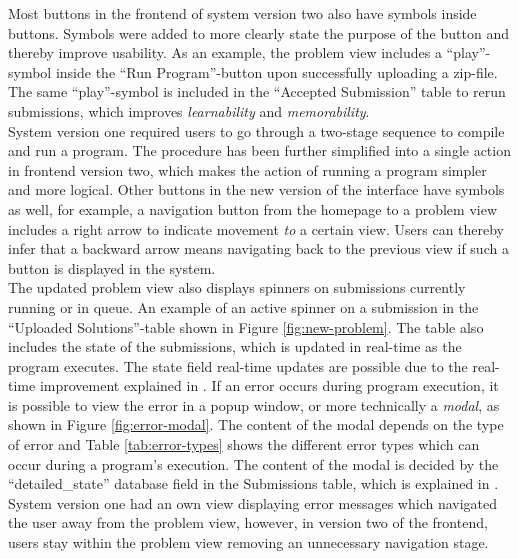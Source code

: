 Most buttons in the frontend of system version two also have symbols inside buttons. Symbols were added to more clearly state the purpose of the button and thereby improve usability. As an example, the problem view includes a ``play''-symbol inside the ``Run Program''-button upon successfully uploading a zip-file. The same ``play''-symbol is included in the ``Accepted Submission'' table to rerun submissions, which improves \textit{learnability} and \textit{memorability}. \\

System version one required users to go through a two-stage sequence to compile and run a program. The procedure has been further simplified into a single action in frontend version two, which makes the action of running a program simpler and more logical. Other buttons in the new version of the interface have symbols as well, for example, a navigation button from the homepage to a problem view includes a right arrow to indicate movement \textit{to} a certain view. Users can thereby infer that a backward arrow means navigating back to the previous view if such a button is displayed in the system. \\

The updated problem view also displays spinners on submissions currently running or in queue. An example of an active spinner on a submission in the ``Uploaded Solutions''-table shown in Figure \ref{fig:new-problem}. The table also includes the state of the submissions, which is updated in real-time as the program executes. The state field real-time updates are possible due to the real-time improvement explained in . If an error occurs during program execution, it is possible to view the error in a popup window, or more technically a \textit{modal}, as shown in Figure \ref{fig:error-modal}. The content of the modal depends on the type of error and Table \ref{tab:error-types} shows the different error types which can occur during a program's execution. The content of the modal is decided by the ``detailed\_state'' database field in the Submissions table, which is explained in . System version one had an own view displaying error messages which navigated the user away from the problem view, however, in version two of the frontend, users stay within the problem view removing an unnecessary navigation stage. \\


